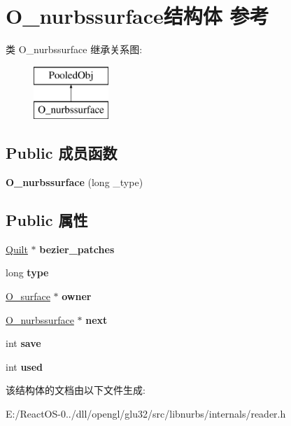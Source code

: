 \hypertarget{struct_o__nurbssurface}{}\section{O\+\_\+nurbssurface结构体 参考}
\label{struct_o__nurbssurface}
类 O\+\_\+nurbssurface 继承关系图\+:\begin{figure}[H]
\begin{center}
\leavevmode
\includegraphics[height=2.000000cm]{struct_o__nurbssurface}
\end{center}
\end{figure}
\subsection*{Public 成员函数}
\begin{DoxyCompactItemize}
\item 
\mbox{\label{struct_o__nurbssurface_ad61a8b29a92f8fce9bb9bb0c759d9d12}} 
{\bfseries O\+\_\+nurbssurface} (long \+\_\+type)
\end{DoxyCompactItemize}
\subsection*{Public 属性}
\begin{DoxyCompactItemize}
\item 
\mbox{\label{struct_o__nurbssurface_ae4f73f862783c75aa480d8ee615b6601}} 
\hyperlink{class_quilt}{Quilt} $\ast$ {\bfseries bezier\+\_\+patches}
\item 
\mbox{\label{struct_o__nurbssurface_ab0e39f23afa6dfd8afdd3df786156a80}} 
long {\bfseries type}
\item 
\mbox{\label{struct_o__nurbssurface_a7b332297207badfb5745c8decbd2a183}} 
\hyperlink{struct_o__surface}{O\+\_\+surface} $\ast$ {\bfseries owner}
\item 
\mbox{\label{struct_o__nurbssurface_a8a416d7a4a0189f5be829b3c7a717d6e}} 
\hyperlink{struct_o__nurbssurface}{O\+\_\+nurbssurface} $\ast$ {\bfseries next}
\item 
\mbox{\label{struct_o__nurbssurface_a3d226ea7c11f361a4d9742a91fd2e3e2}} 
int {\bfseries save}
\item 
\mbox{\label{struct_o__nurbssurface_a83433f3cd05cc2f895ab2e512868356f}} 
int {\bfseries used}
\end{DoxyCompactItemize}


该结构体的文档由以下文件生成\+:\begin{DoxyCompactItemize}
\item 
E\+:/\+React\+O\+S-\/0../dll/opengl/glu32/src/libnurbs/internals/reader.\+h\end{DoxyCompactItemize}
